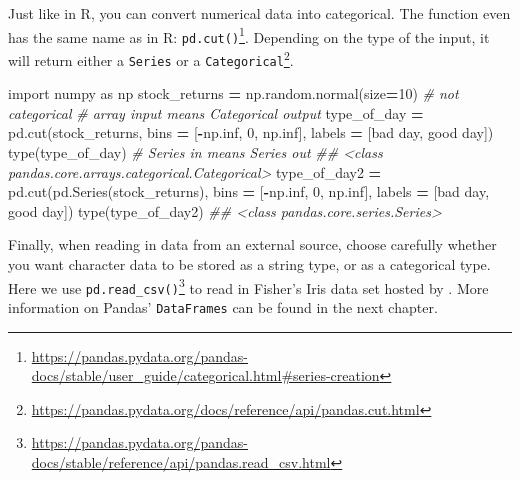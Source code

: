 \documentclass[
  12pt,
  krantz2]{krantz}
\makeatletter
\newenvironment{Shaded}{\begin{snugshade}}{\end{snugshade}}
\newcommand{\BuiltInTok}[1]{#1}
\newcommand{\CommentTok}[1]{\textcolor[rgb]{0.37,0.37,0.37}{\textit{#1}}}
\newcommand{\DecValTok}[1]{\textcolor[rgb]{0.06,0.06,0.06}{#1}}
\newcommand{\ImportTok}[1]{#1}
\newcommand{\NormalTok}[1]{#1}
\newcommand{\OperatorTok}[1]{\textcolor[rgb]{0.43,0.43,0.43}{\textbf{#1}}}
\newcommand{\StringTok}[1]{\textcolor[rgb]{0.5,0.5,0.5}{#1}}
\renewcommand{\href}[2]{#2\footnote{\url{#1}}}
\newenvironment{kframe}{%
\medskip{}
\setlength{\fboxsep}{.8em}
 \def\at@end@of@kframe{}%
 \ifinner\ifhmode%
  \def\at@end@of@kframe{\end{minipage}}%
  \begin{minipage}{\columnwidth}%
 \fi\fi%
 \def\FrameCommand##1{\hskip\@totalleftmargin \hskip-\fboxsep
 \colorbox{shadecolor}{##1}\hskip-\fboxsep
     \hskip-\linewidth \hskip-\@totalleftmargin \hskip\columnwidth}%
 \MakeFramed {\advance\hsize-\width
   \@totalleftmargin\z@ \linewidth\hsize
   \@setminipage}}%
 {\par\unskip\endMakeFramed%
 \at@end@of@kframe}
\renewenvironment{Shaded}{\begin{kframe}}{\end{kframe}}
\makeatother
\begin{document}
Just like in R, you can convert numerical data into categorical. The function even has the same name as in R: \href{https://pandas.pydata.org/pandas-docs/stable/user_guide/categorical.html\#series-creation}{\texttt{pd.cut()}}. Depending on the type of the input, \href{https://pandas.pydata.org/docs/reference/api/pandas.cut.html}{it will return either a \texttt{Series} or a \texttt{Categorical}}.

\begin{Shaded}
\begin{Highlighting}[]
\ImportTok{import}\NormalTok{ numpy }\ImportTok{as}\NormalTok{ np}
\NormalTok{stock\_returns }\OperatorTok{=}\NormalTok{ np.random.normal(size}\OperatorTok{=}\DecValTok{10}\NormalTok{) }\CommentTok{\# not categorical }
\CommentTok{\# array input means Categorical output}
\NormalTok{type\_of\_day }\OperatorTok{=}\NormalTok{ pd.cut(stock\_returns, }
\NormalTok{                      bins }\OperatorTok{=}\NormalTok{ [}\OperatorTok{{-}}\NormalTok{np.inf, }\DecValTok{0}\NormalTok{, np.inf], }
\NormalTok{                      labels }\OperatorTok{=}\NormalTok{ [}\StringTok{\textquotesingle{}bad day\textquotesingle{}}\NormalTok{, }\StringTok{\textquotesingle{}good day\textquotesingle{}}\NormalTok{]) }
\BuiltInTok{type}\NormalTok{(type\_of\_day)}
\CommentTok{\# Series in means Series out}
\CommentTok{\#\# \textless{}class \textquotesingle{}pandas.core.arrays.categorical.Categorical\textquotesingle{}\textgreater{}}
\NormalTok{type\_of\_day2 }\OperatorTok{=}\NormalTok{ pd.cut(pd.Series(stock\_returns), }
\NormalTok{                      bins }\OperatorTok{=}\NormalTok{ [}\OperatorTok{{-}}\NormalTok{np.inf, }\DecValTok{0}\NormalTok{, np.inf], }
\NormalTok{                      labels }\OperatorTok{=}\NormalTok{ [}\StringTok{\textquotesingle{}bad day\textquotesingle{}}\NormalTok{, }\StringTok{\textquotesingle{}good day\textquotesingle{}}\NormalTok{]) }
\BuiltInTok{type}\NormalTok{(type\_of\_day2)}
\CommentTok{\#\# \textless{}class \textquotesingle{}pandas.core.series.Series\textquotesingle{}\textgreater{}}
\end{Highlighting}
\end{Shaded}

Finally, when reading in data from an external source, choose carefully whether you want character data to be stored as a string type, or as a categorical type. Here we use \href{https://pandas.pydata.org/pandas-docs/stable/reference/api/pandas.read_csv.html}{\texttt{pd.read\_csv()}} to read in Fisher's Iris data set \citep{misc_iris_53} hosted by \citep{uci_data}. More information on Pandas' \texttt{DataFrames} can be found in the next chapter.
\end{document}
